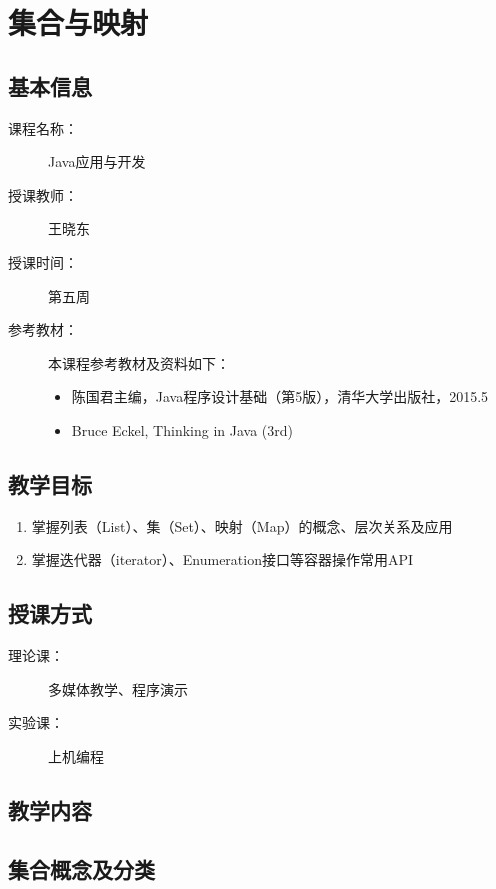 \chapter{集合与映射}
\label{chp:Set-list-map}

\section*{基本信息}
\sline
\begin{description}
\item[课程名称：] Java应用与开发
\item[授课教师：] 王晓东
\item[授课时间：] 第五周
\item[参考教材：] 本课程参考教材及资料如下：
  \begin{itemize}
  \item 陈国君主编，Java程序设计基础（第5版），清华大学出版社，2015.5
  \item Bruce Eckel, Thinking in Java (3rd)
  \end{itemize}
\end{description}

\section*{教学目标}

\sline

\begin{enumerate}
\item 掌握列表（List）、集（Set）、映射（Map）的概念、层次关系及应用
\item 掌握迭代器（iterator）、Enumeration接口等容器操作常用API
\end{enumerate}

\section*{授课方式}

\sline
\begin{description}
\item[理论课：] 多媒体教学、程序演示
\item[实验课：] 上机编程
\end{description}

\newpage
\section*{教学内容}
\sline

\section{集合概念及分类}


